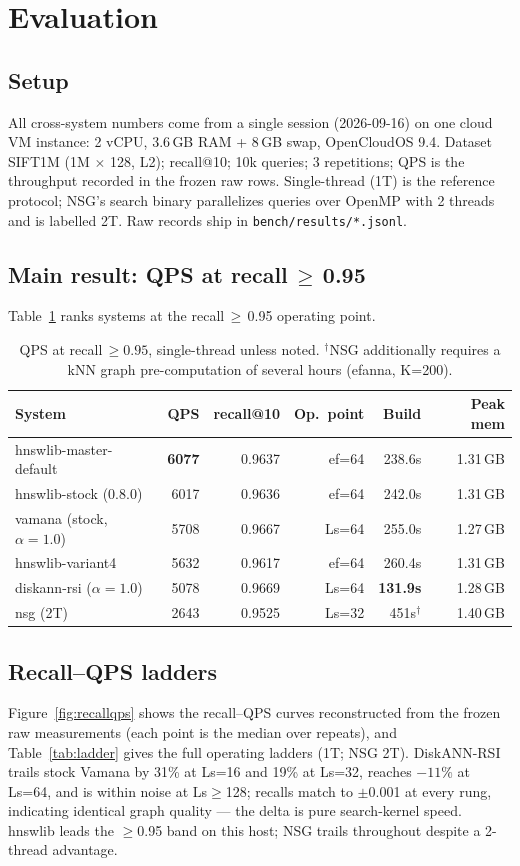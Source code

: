 \documentclass[11pt]{article}
\begin{document}
\section{Evaluation}
\label{sec:eval}
\subsection{Setup}
All cross-system numbers come from a single session (2026-09-16) on one
cloud VM instance: 2 vCPU, 3.6\,GB RAM + 8\,GB swap, OpenCloudOS 9.4.
Dataset SIFT1M (1M $\times$ 128, L2); recall@10; 10k queries; 3 repetitions;
QPS is the throughput recorded in the frozen raw rows. Single-thread (1T) is
the reference protocol; NSG's search
binary parallelizes queries over OpenMP with 2 threads and is labelled 2T.
Raw records ship in \texttt{bench/results/*.jsonl}.

\subsection{Main result: QPS at recall\,$\ge$\,0.95}
Table~\ref{tab:main} ranks systems at the recall\,$\ge$\,0.95 operating
point.

\begin{table}[t]
\centering
\small
\begin{tabular}{@{}lrrrrr@{}}
\toprule
System & QPS & recall@10 & Op.\ point & Build & Peak mem \\
\midrule
hnswlib-master-default & \textbf{6077} & 0.9637 & ef=64 & 238.6s & 1.31\,GB \\
hnswlib-stock (0.8.0) & 6017 & 0.9636 & ef=64 & 242.0s & 1.31\,GB \\
vamana (stock, $\alpha{=}1.0$) & 5708 & 0.9667 & Ls=64 & 255.0s & 1.27\,GB \\
hnswlib-variant4 & 5632 & 0.9617 & ef=64 & 260.4s & 1.31\,GB \\
diskann-rsi ($\alpha{=}1.0$) & 5078 & 0.9669 & Ls=64 & \textbf{131.9s} & 1.28\,GB \\
nsg (2T) & 2643 & 0.9525 & Ls=32 & 451s$^\dagger$ & 1.40\,GB \\
\bottomrule
\end{tabular}
\caption{QPS at recall\,$\ge 0.95$, single-thread unless noted.
$^\dagger$NSG additionally requires a kNN graph pre-computation of several
hours (efanna, K=200).}
\label{tab:main}
\end{table}

\subsection{Recall--QPS ladders}
Figure~\ref{fig:recallqps} shows the recall--QPS curves reconstructed from the
frozen raw measurements (each point is the median over repeats), and
Table~\ref{tab:ladder} gives the full operating ladders (1T; NSG 2T).
DiskANN-RSI trails stock Vamana by 31\% at Ls=16 and 19\% at Ls=32, reaches
$-11\%$ at Ls=64, and is within noise at Ls$\ge$128; recalls match to
$\pm$0.001 at every rung, indicating identical graph quality --- the delta is
pure search-kernel speed. hnswlib leads the $\ge$0.95 band on this host;
NSG trails throughout despite a 2-thread advantage.
\end{document}

